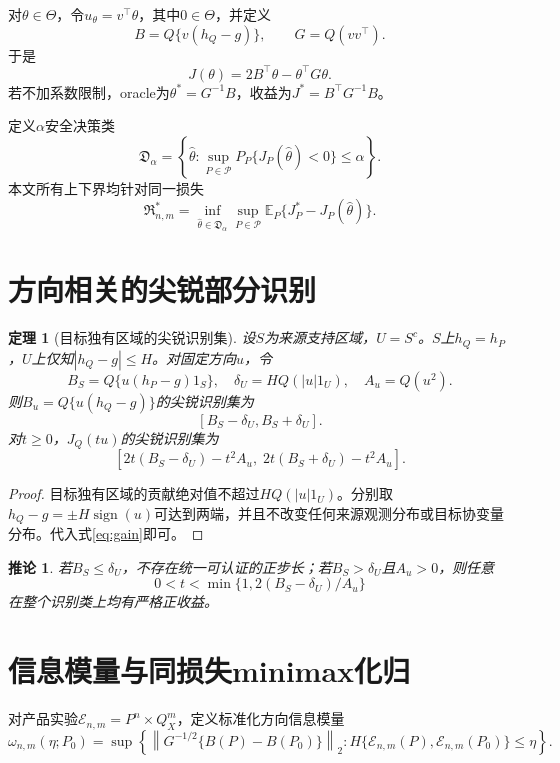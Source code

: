 \documentclass[UTF8,12pt]{ctexart}
\newtheorem{theorem}{定理}
\newtheorem{corollary}{推论}
\newcommand{\E}{\mathbb E}
\newcommand{\norm}[1]{\left\lVert #1\right\rVert}
\begin{document}
对$\theta\in\Theta$，令$u_\theta=v^\top\theta$，其中$0\in\Theta$，并定义
\[
B=Q\{v(h_Q-g)\},\qquad G=Q(vv^\top).
\]
于是
\begin{equation}
J(\theta)=2B^\top\theta-\theta^\top G\theta.
\label{eq:quadratic}
\end{equation}
若不加系数限制，oracle为$\theta^*=G^{-1}B$，收益为$J^*=B^\top G^{-1}B$。

定义$\alpha$安全决策类
\[
\mathfrak D_\alpha=
\left\{\widehat\theta:
\sup_{P\in\mathcal P}P_P\{J_P(\widehat\theta)<0\}\le\alpha
\right\}.
\]
本文所有上下界均针对同一损失
\begin{equation}
\mathfrak R^*_{n,m}=
\inf_{\widehat\theta\in\mathfrak D_\alpha}
\sup_{P\in\mathcal P}
\E_P\{J_P^*-J_P(\widehat\theta)\}.
\label{eq:minimax}
\end{equation}

\section{方向相关的尖锐部分识别}
\begin{theorem}[目标独有区域的尖锐识别集]\label{thm:id}
设$S$为来源支持区域，$U=S^c$。$S$上$h_Q=h_P$，$U$上仅知$|h_Q-g|\le H$。对固定方向$u$，令
\[
B_S=Q\{u(h_P-g)1_S\},\quad
\delta_U=H Q(|u|1_U),\quad
A_u=Q(u^2).
\]
则$B_u=Q\{u(h_Q-g)\}$的尖锐识别集为
\[
[B_S-\delta_U,B_S+\delta_U].
\]
对$t\ge0$，$J_Q(tu)$的尖锐识别集为
\[
[2t(B_S-\delta_U)-t^2A_u,\;2t(B_S+\delta_U)-t^2A_u].
\]
\end{theorem}
\begin{proof}
目标独有区域的贡献绝对值不超过$H Q(|u|1_U)$。分别取$h_Q-g=\pm H\operatorname{sign}(u)$可达到两端，并且不改变任何来源观测分布或目标协变量分布。代入式\eqref{eq:gain}即可。
\end{proof}

\begin{corollary}
若$B_S\le\delta_U$，不存在统一可认证的正步长；若$B_S>\delta_U$且$A_u>0$，则任意
\[
0<t<\min\{1,2(B_S-\delta_U)/A_u\}
\]
在整个识别类上均有严格正收益。
\end{corollary}

\section{信息模量与同损失minimax化归}
对产品实验$\mathcal E_{n,m}=P^n\times Q_X^m$，定义标准化方向信息模量
\[
\omega_{n,m}(\eta;P_0)=
\sup\left\{
\norm{G^{-1/2}\{B(P)-B(P_0)\}}_2:
H\{\mathcal E_{n,m}(P),\mathcal E_{n,m}(P_0)\}\le\eta
\right\}.
\]
\end{document}
